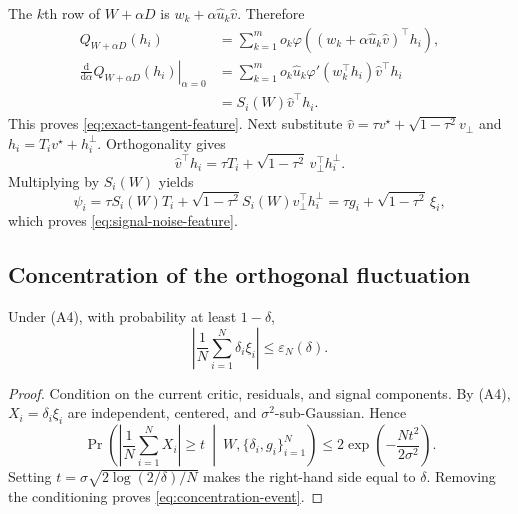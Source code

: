 The $k$th row of $W+\alpha D$ is
$w_k+\alpha\hat u_k\hat v$.  Therefore
\begin{align}
    Q_{W+\alpha D}(h_i)
    &=\sum_{k=1}^m o_k
      \varphi\!\left((w_k+\alpha\hat u_k\hat v)^\top h_i\right),\\
    \left.\frac{\mathrm d}{\mathrm d\alpha}
      Q_{W+\alpha D}(h_i)\right|_{\alpha=0}
    &=\sum_{k=1}^m o_k\hat u_k
      \varphi'(w_k^\top h_i)\hat v^\top h_i\\
    &=S_i(W)\hat v^\top h_i.
\end{align}
This proves \eqref{eq:exact-tangent-feature}.  Next substitute
$\hat v=\tau v^\star+\sqrt{1-\tau^2}v_\perp$ and
$h_i=T_i v^\star+h_i^\perp$.  Orthogonality gives
\begin{equation}
    \hat v^\top h_i
    =\tau T_i+\sqrt{1-\tau^2}\,v_\perp^\top h_i^\perp.
\end{equation}
Multiplying by $S_i(W)$ yields
\begin{equation}
    \psi_i
    =\tau S_i(W)T_i
     +\sqrt{1-\tau^2}S_i(W)v_\perp^\top h_i^\perp
    =\tau g_i+\sqrt{1-\tau^2}\,\xi_i,
\end{equation}
which proves \eqref{eq:signal-noise-feature}.

\subsection{Concentration of the orthogonal fluctuation}

\begin{lemma}
\label{lem:conditional-concentration}
Under (A4), with probability at least $1-\delta$,
\begin{equation}
    \left|\frac1N\sum_{i=1}^N\delta_i\xi_i\right|
    \le\varepsilon_N(\delta).
    \label{eq:concentration-event}
\end{equation}
\end{lemma}

\begin{proof}
Condition on the current critic, residuals, and signal components.  By (A4),
$X_i=\delta_i\xi_i$ are independent, centered, and
$\sigma^2$-sub-Gaussian.  Hence
\begin{equation}
    \Pr\!\left(
      \left|\frac1N\sum_{i=1}^N X_i\right|\ge t
      \ \middle|\ W,\{\delta_i,g_i\}_{i=1}^N
    \right)
    \le 2\exp\!\left(-\frac{Nt^2}{2\sigma^2}\right).
\end{equation}
Setting $t=\sigma\sqrt{2\log(2/\delta)/N}$ makes the right-hand side
equal to $\delta$.  Removing the conditioning proves
\eqref{eq:concentration-event}.
\end{proof}

